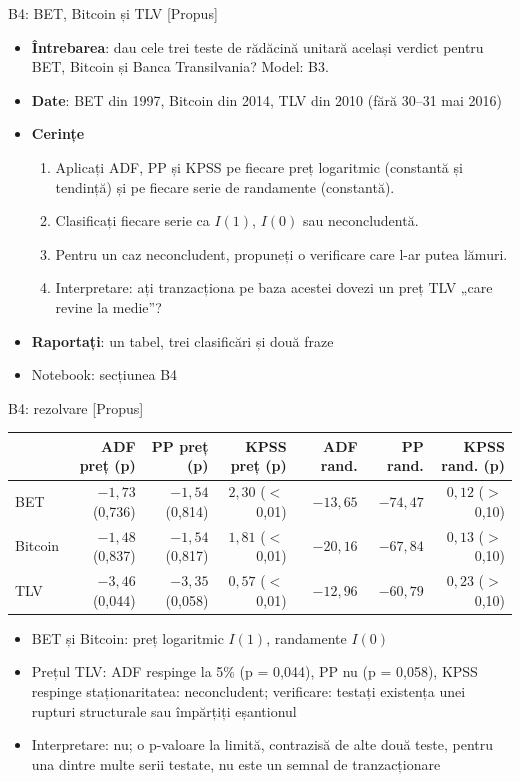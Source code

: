 \begin{frame}{B4: BET, Bitcoin și TLV [Propus]}
\itemsize{\footnotesize}
\begin{itemize}
\item \textbf{Întrebarea}: dau cele trei teste de rădăcină unitară același verdict pentru BET, Bitcoin și Banca Transilvania? Model: B3.
\item \textbf{Date}: BET din 1997, Bitcoin din 2014, TLV din 2010 (fără 30--31 mai 2016)
\item \textbf{Cerințe}
\begin{enumerate}
    \item Aplicați ADF, PP și KPSS pe fiecare preț logaritmic (constantă și tendință) și pe fiecare serie de randamente (constantă).
    \item Clasificați fiecare serie ca $I(1)$, $I(0)$ sau neconcludentă.
    \item Pentru un caz neconcludent, propuneți o verificare care l-ar putea lămuri.
    \item Interpretare: ați tranzacționa pe baza acestei dovezi un preț TLV „care revine la medie”?
\end{enumerate}
\item \textbf{Raportați}: un tabel, trei clasificări și două fraze
\item Notebook: secțiunea B4
\end{itemize}
\end{frame}

\ifsolutions
\begin{frame}{B4: rezolvare [Propus]}
\itemsize{\footnotesize}
\begin{center}
\scriptsize
\begin{tabular}{lrrrrrr}
\toprule
& ADF preț (p) & PP preț (p) & KPSS preț (p) & ADF rand. & PP rand. & KPSS rand. (p) \\
\midrule
BET & ${-1{,}73}$ (0{,}736) & ${-1{,}54}$ (0{,}814) & $2{,}30$ ($<$\,0{,}01) & ${-13{,}65}$ & ${-74{,}47}$ & $0{,}12$ ($>$\,0{,}10) \\
Bitcoin & ${-1{,}48}$ (0{,}837) & ${-1{,}54}$ (0{,}817) & $1{,}81$ ($<$\,0{,}01) & ${-20{,}16}$ & ${-67{,}84}$ & $0{,}13$ ($>$\,0{,}10) \\
TLV & ${-3{,}46}$ (0{,}044) & ${-3{,}35}$ (0{,}058) & $0{,}57$ ($<$\,0{,}01) & ${-12{,}96}$ & ${-60{,}79}$ & $0{,}23$ ($>$\,0{,}10) \\
\bottomrule
\end{tabular}
\end{center}
\begin{itemize}
    \item BET și Bitcoin: preț logaritmic $I(1)$, randamente $I(0)$
    \item Prețul TLV: ADF respinge la 5\% (p = 0{,}044), PP nu (p = 0{,}058), KPSS respinge staționaritatea: neconcludent; verificare: testați existența unei rupturi structurale sau împărțiți eșantionul
    \item Interpretare: nu; o p-valoare la limită, contrazisă de alte două teste, pentru una dintre multe serii testate, nu este un semnal de tranzacționare
\end{itemize}
\end{frame}
\fi

